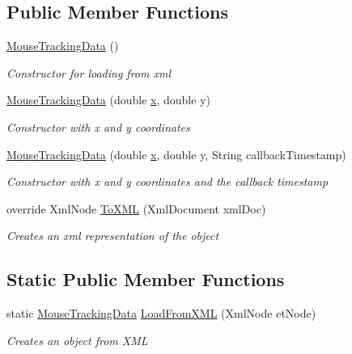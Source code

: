 \subsection*{Public Member Functions}
\begin{DoxyCompactItemize}
\item 
\hyperlink{class_web_analyzer_1_1_models_1_1_data_model_1_1_mouse_tracking_data_a38482ac54ba153ef229c8c6313462e08}{Mouse\+Tracking\+Data} ()
\begin{DoxyCompactList}\small\item\em Constructor for loading from xml \end{DoxyCompactList}\item 
\hyperlink{class_web_analyzer_1_1_models_1_1_data_model_1_1_mouse_tracking_data_a49172e5d351b98a72488de19db61cb63}{Mouse\+Tracking\+Data} (double \hyperlink{_u_i_2_h_t_m_l_resources_2js_2lib_2underscore_8min_8js_a81e910173af87b1161e719a504d52407}{x}, double y)
\begin{DoxyCompactList}\small\item\em Constructor with x and y coordinates \end{DoxyCompactList}\item 
\hyperlink{class_web_analyzer_1_1_models_1_1_data_model_1_1_mouse_tracking_data_a84d4d864926c20f1467500df28bed785}{Mouse\+Tracking\+Data} (double \hyperlink{_u_i_2_h_t_m_l_resources_2js_2lib_2underscore_8min_8js_a81e910173af87b1161e719a504d52407}{x}, double y, String callback\+Timestamp)
\begin{DoxyCompactList}\small\item\em Constructor with x and y coordinates and the callback timestamp \end{DoxyCompactList}\item 
override Xml\+Node \hyperlink{class_web_analyzer_1_1_models_1_1_data_model_1_1_mouse_tracking_data_ac1af00e598088574f90d7431888af2e3}{To\+X\+M\+L} (Xml\+Document xml\+Doc)
\begin{DoxyCompactList}\small\item\em Creates an xml representation of the object \end{DoxyCompactList}\end{DoxyCompactItemize}
\subsection*{Static Public Member Functions}
\begin{DoxyCompactItemize}
\item 
static \hyperlink{class_web_analyzer_1_1_models_1_1_data_model_1_1_mouse_tracking_data}{Mouse\+Tracking\+Data} \hyperlink{class_web_analyzer_1_1_models_1_1_data_model_1_1_mouse_tracking_data_ab48b52dcbbb5ab0f1fb3e3e5c929f082}{Load\+From\+X\+M\+L} (Xml\+Node et\+Node)
\begin{DoxyCompactList}\small\item\em Creates an object from X\+M\+L \end{DoxyCompactList}\end{DoxyCompactItemize}
